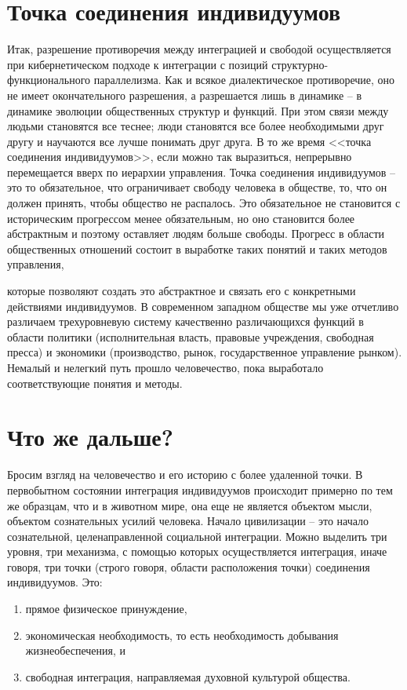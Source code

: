 \documentclass{book}
\begin{document}
\section{Точка соединения индивидуумов}

Итак, разрешение противоречия между интеграцией и свободой осуществляется при кибернетическом подходе к интеграции с позиций структурно-функционального параллелизма. Как и всякое диалектическое противоречие, оно не имеет окон­чательного разрешения, а разрешается лишь в динамике -- в динамике эволюции общественных структур и функций. При этом связи между людьми становятся все теснее; люди становятся все более необходимыми друг другу и научаются все лучше понимать друг друга. В то же время <<точка соединения индивидуумов>>, если можно так выразиться, непрерывно перемещается вверх по иерархии управления. Точка соединения индивидуумов -- это то обязательное, что ограничивает свободу человека в обществе, то, что он должен принять, чтобы общество не распалось. Это обязательное не становится с историческим прогрессом менее обязательным, но оно становится более абстрактным  и поэтому оставляет людям больше свободы. Прогресс в области общественных отношений состоит в выработке таких понятий и таких методов управления,
 
которые позволяют создать это абстрактное и связать его с конкретными действиями индивидуумов. В современном западном обществе мы уже отчетливо различаем трехуровневую систему качественно различающихся функций в области политики (исполни­тельная власть, правовые учреждения, свободная пресса) и эко­номики (производство, рынок, государственное управление рынком). Немалый и нелегкий путь прошло человечество, пока выработало соответствующие понятия и методы.



\section{Что же дальше?}

Бросим взгляд на человечество и его историю с более уда­ленной точки. В первобытном состоянии интеграция индивиду­умов происходит примерно по тем же образцам, что и в живот­ном мире, она еще не является объектом мысли, объектом со­знательных усилий человека. Начало цивилизации -- это начало сознательной, целенаправленной социальной интеграции. Можно выделить три уровня, три механизма, с помощью которых осуществляется интеграция, иначе говоря, три точки (строго говоря, области расположения точки) соединения индивидуумов. Это:
\begin{enumerate}
 \item прямое физическое принуждение,
 \item экономическая необходимость, то есть необходимость добывания жизнеобеспечения, и
 \item свободная интеграция, направляемая духовной культурой общества. 
\end{enumerate}
\end{document}
